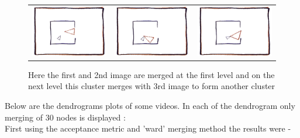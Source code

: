\documentclass[11pt]{report}
\begin{document}
\begin{figure}[H]
\centering
\begin{tabular}{ccc}
\includegraphics[scale=0.3]{coax210.png} &
\includegraphics[scale=0.3]{coax220.png} &
\includegraphics[scale=0.3]{coax240.png} 
\end{tabular}
\caption{Here the first and 2nd image are merged at the first level and on the next level this cluster merges with 3rd image to form another cluster}
\end{figure}


Below are the dendrograms plots of some videos. In each of the dendrogram only merging of $30$ nodes is displayed :\\
First using the acceptance metric and 'ward' merging method the results were - \\
\end{document}
